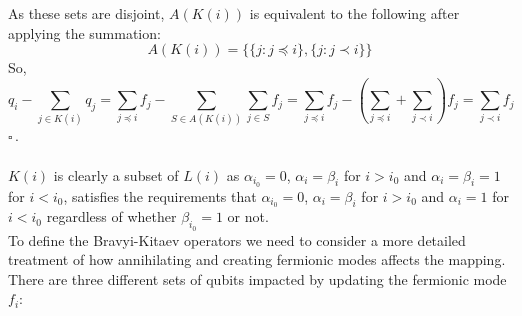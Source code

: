\documentclass[twoside]{article}
\begin{document}
        As these sets are disjoint, $A(K(i))$ is equivalent to the following after applying the summation:
        \begin{equation}
                A(K(i)) = \{ \{ j: j \preceq i \}, \{j: j \prec i \}\}
        \end{equation}
So,
\begin{equation}
        q_i - \sum_{j \in K(i)} q_j = \sum_{j \preceq i} f_j - \sum_{S \in A(K(i))} \sum_{j \in S} f_j = \sum_{j \preceq i }f_j - \left( \sum_{j \preceq i} + \sum_{j \prec i}\right) f_j = \sum_{j \prec i} f_j
        \end{equation}
         $\square$\,.\\\\
         $K(i)$ is clearly a subset of $L(i)$ as $\alpha_{i_0} = 0$, $\alpha_i = \beta_i$ for $i> i_0$ and $\alpha_i = \beta_i = 1$ for $i< i_0$, satisfies the requirements that $\alpha_{i_0} = 0$, $\alpha_i = \beta_i$ for $i > i_0$ and $\alpha_i =1$ for $i < i_0$ regardless of whether $\beta_{i_0} =1$ or not.
         \pagebreak \\
To define the Bravyi-Kitaev operators we need to consider a more detailed treatment of how annihilating and creating fermionic modes affects the mapping. There are three different sets of qubits impacted by updating the fermionic mode $f_i$:
\end{document}
